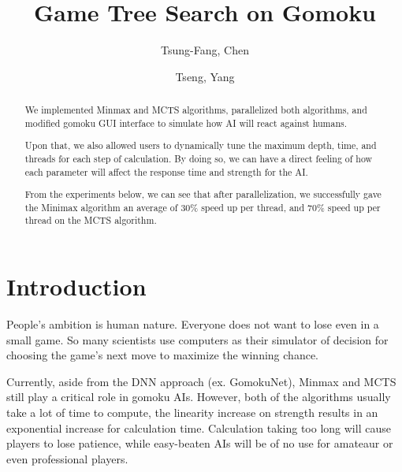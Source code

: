 \documentclass[sigconf]{acmart}
\begin{document}
\title{Game Tree Search on Gomoku}

\author{Tsung-Fang, Chen}

\author{Tseng, Yang}



\begin{abstract}

We implemented Minmax and MCTS algorithms, parallelized both algorithms, and modified gomoku GUI interface to simulate how AI will react against humans.

Upon that, we also allowed users to dynamically tune the maximum depth, time, and threads for each step of calculation. By doing so, we can have a direct feeling of how each parameter will affect the response time and strength for the AI.

From the experiments below, we can see that after parallelization, we successfully gave the Minimax algorithm an average of 30\% speed up per thread, and 70\% speed up per thread on the MCTS algorithm.

\end{abstract}

\keywords{}
\maketitle






\section{Introduction}

People’s ambition is human nature. Everyone does not want to lose even in a small game. So many scientists use computers as their simulator of decision for choosing the game’s next move to maximize the winning chance. 

Currently, aside from the DNN approach (ex. GomokuNet),  Minmax and MCTS still play a critical role in gomoku AIs. However, both of the algorithms usually take a lot of time to compute, the linearity increase on strength results in an exponential increase for calculation time. Calculation taking too long will cause players to lose patience, while easy-beaten AIs will be of no use for amateaur or even professional players.
\end{document}
